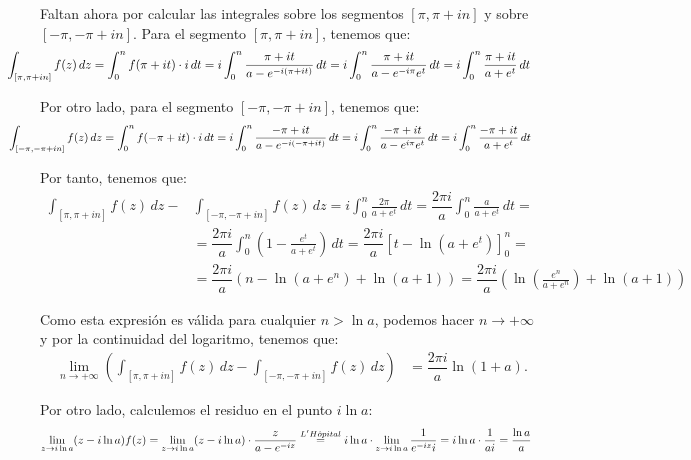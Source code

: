 \begin{ejercicio}
    Faltan ahora por calcular las integrales sobre los segmentos $[\pi, \pi + i n]$ y sobre $[-\pi, -\pi + i n]$. Para el segmento $[\pi, \pi + i n]$, tenemos que:
    \begin{align*}
        \hspace{-1cm}\int_{[\pi, \pi + i n]} f(z) \, dz &= \int_0^n f(\pi + i t)\cdot i \, dt
        = i\int_0^n \frac{\pi + i t}{a - e^{-i(\pi + i t)}} \, dt
        = i\int_0^n \frac{\pi + i t}{a -e^{-i\pi}e^{t}} \, dt
        = i\int_0^n \frac{\pi + i t}{a + e^{t}} \, dt
    \end{align*}

    Por otro lado, para el segmento $[-\pi, -\pi + i n]$, tenemos que:
    \begin{align*}
        \hspace{-1cm}\int_{[-\pi, -\pi + i n]} f(z) \, dz &= \int_0^n f(-\pi + i t)\cdot i \, dt
        = i\int_0^n \frac{-\pi + i t}{a - e^{-i(-\pi + i t)}} \, dt
        = i\int_0^n \frac{-\pi + i t}{a -e^{i\pi}e^{t}} \, dt
        = i\int_0^n \frac{-\pi + i t}{a + e^{t}} \, dt
    \end{align*}

    Por tanto, tenemos que:
    \begin{align*}
        \int_{[\pi, \pi + i n]} f(z) \, dz -& \int_{[-\pi, -\pi + i n]} f(z) \, dz = i\int_0^n \frac{2\pi}{a + e^{t}} \, dt
        = \dfrac{2\pi i}{a}\int_0^n \frac{a}{a + e^{t}} \, dt
        =\\&= \dfrac{2\pi i}{a}\int_0^n \left(1 - \frac{e^{t}}{a + e^{t}}\right) \, dt
        = \dfrac{2\pi i}{a}\left[t - \ln(a + e^{t})\right]_0^n
        =\\&= \dfrac{2\pi i}{a}\left(n - \ln(a + e^{n}) + \ln(a + 1)\right)
        = \dfrac{2\pi i}{a}\left(\ln\left(\frac{e^{n}}{a + e^{n}}\right) + \ln(a + 1)\right)
    \end{align*}

    Como esta expresión es válida para cualquier $n > \ln a$, podemos hacer $n \to +\infty$ y por la continuidad del logaritmo, tenemos que:
    \begin{align*}
        \lim_{n\to+\infty} \left(\int_{[\pi, \pi + i n]} f(z) \, dz - \int_{[-\pi, -\pi + i n]} f(z) \, dz\right) &= \dfrac{2\pi i}{a}\ln\left(1+a\right).
    \end{align*}

    Por otro lado, calculemos el residuo en el punto $i\ln a$:
    \begin{align*}
        \lim_{z\to i\ln a} (z - i\ln a)f(z) &= \lim_{z\to i\ln a} (z - i\ln a)\cdot \frac{z}{a - e^{-i z}}
        \stackrel{L'H\hat{o}pital}{=} i\ln a\cdot \lim_{z\to i\ln a} \frac{1}{e^{-i z}i}
        = i\ln a\cdot \frac{1}{ai} = \frac{\ln a}{a}
    \end{align*}


\end{ejercicio}
